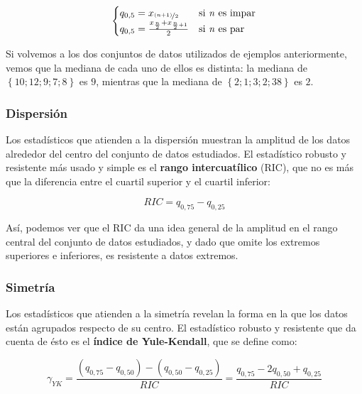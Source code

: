 \documentclass[12pt]{article}
\begin{document}
\begin{equation}
\begin{cases}
q_{0,5} = x_{\nicefrac{(n + 1)}{2}} &\text{si \textit{n} es impar}\\
q_{0,5} = \frac{x_{\frac{n}{2}} + x_{\frac{n}{2} + 1}}{2} &\text{si \textit{n} es par}
\end{cases}
\label{eq:median}
\end{equation}

Si volvemos a los dos conjuntos de datos utilizados de ejemplos anteriormente, vemos que la mediana de cada uno de ellos es distinta: la mediana de $\left\lbrace 10; 12; 9; 7; 8 \right\rbrace$ es $9$, mientras que la mediana de $\left\lbrace 2; 1; 3; 2; 38 \right\rbrace$ es $2$.

\subsubsection{Dispersión}

Los estadísticos que atienden a la dispersión muestran la amplitud de los datos alrededor del centro del conjunto de datos estudiados. El estadístico robusto y resistente más usado y simple es el \textbf{rango intercuatílico} (RIC), que no es más que la diferencia entre el cuartil superior y el cuartil inferior:

\begin{equation}
RIC = q_{0,75} - q_{0,25}
\label{eq:ric}
\end{equation}

Así, podemos ver que el RIC da una idea general de la amplitud en el rango central del conjunto de datos estudiados, y dado que omite los extremos superiores e inferiores, es resistente a datos extremos.

\subsubsection{Simetría}

Los estadísticos que atienden a la simetría revelan la forma en la que los datos están agrupados respecto de su centro. El estadístico robusto y resistente que da cuenta de ésto es el \textbf{índice de Yule-Kendall}, que se define como:

\begin{equation}
\gamma_{YK} = \frac{(q_{0,75} - q_{0,50}) - (q_{0,50} - q_{0,25})}{RIC} = \frac{q_{0,75} - 2 q_{0,50} + q_{0,25}}{RIC}
\label{eq:yule-kendall}
\end{equation}
\end{document}
